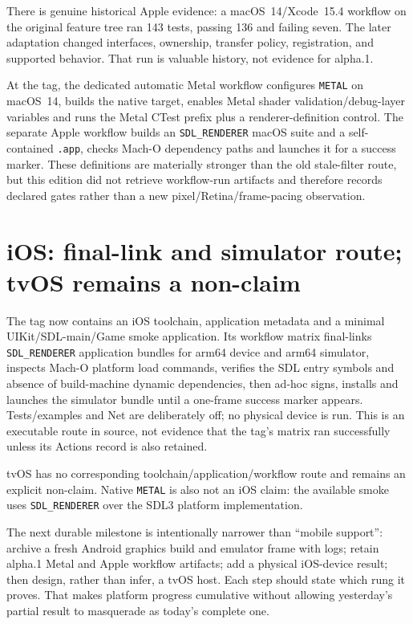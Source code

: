 There is genuine historical Apple evidence: a macOS~14/Xcode~15.4 workflow on the original
feature tree ran 143 tests, passing 136 and failing seven.  The later adaptation changed
interfaces, ownership, transfer policy, registration, and supported behavior.  That run is
valuable history, not evidence for alpha.1.

At the tag, the dedicated automatic Metal workflow configures \texttt{METAL} on macOS~14, builds
the native target, enables Metal shader validation/debug-layer variables and runs the Metal CTest
prefix plus a renderer-definition control.  The separate Apple workflow builds an
\texttt{SDL\_RENDERER} macOS suite and a self-contained \texttt{.app}, checks Mach-O dependency
paths and launches it for a success marker.  These definitions are materially stronger than the
old stale-filter route, but this edition did not retrieve workflow-run artifacts and therefore
records declared gates rather than a new pixel/Retina/frame-pacing observation.

\section{iOS: final-link and simulator route; tvOS remains a non-claim}

The tag now contains an iOS toolchain, application metadata and a minimal UIKit/SDL-main/Game
smoke application.  Its workflow matrix final-links \texttt{SDL\_RENDERER} application bundles
for arm64 device and arm64 simulator, inspects Mach-O platform load commands, verifies the SDL
entry symbols and absence of build-machine dynamic dependencies, then ad-hoc signs, installs and
launches the simulator bundle until a one-frame success marker appears.  Tests/examples and Net
are deliberately off; no physical device is run.  This is an executable route in source, not
evidence that the tag's matrix ran successfully unless its Actions record is also retained.

tvOS has no corresponding toolchain/application/workflow route and remains an explicit
non-claim.  Native \texttt{METAL} is also not an iOS claim: the available smoke uses
\texttt{SDL\_RENDERER} over the SDL3 platform implementation.

The next durable milestone is intentionally narrower than ``mobile support'': archive a fresh
Android graphics build and emulator frame with logs; retain alpha.1 Metal and Apple workflow
artifacts; add a physical iOS-device result; then design, rather than infer, a tvOS host.  Each step should state
which rung it proves.  That makes platform progress cumulative without allowing yesterday's
partial result to masquerade as today's complete one.
